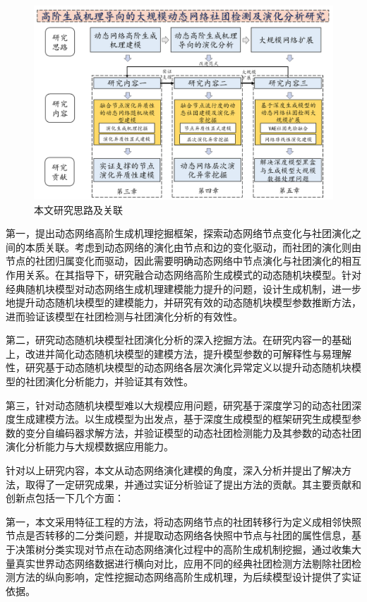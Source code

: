 \begin{figure}[htbp]
    \centering
    \includegraphics[width=.9\linewidth]{figures/chap01/framework.png}
    \caption{本文研究思路及关联}
    \label{chap1:fig:framework}
\end{figure}

第一，提出动态网络高阶生成机理挖掘框架，探索动态网络节点变化与社团演化之间的本质关联。考虑到动态网络的演化由节点和边的变化驱动，而社团的演化则由节点的社团归属变化而驱动，因此需要明确动态网络中节点演化与社团演化的相互作用关系。在其指导下，研究融合动态网络高阶生成模式的动态随机块模型。针对经典随机块模型对动态网络生成机理建模能力提升的问题，设计生成机制，进一步地提升动态随机块模型的建模能力，并研究有效的动态随机块模型参数推断方法，进而验证该模型在社团检测与社团演化分析的有效性。

第二，研究动态随机块模型社团演化分析的深入挖掘方法。在研究内容一的基础上，改进并简化动态随机块模型的建模方法，提升模型参数的可解释性与易理解性，研究基于动态随机块模型的动态网络各层次演化异常定义以提升动态随机块模型的社团演化分析能力，并验证其有效性。

第三，针对动态随机块模型难以大规模应用问题，研究基于深度学习的动态社团深度生成建模方法。以生成模型为出发点，基于深度生成模型的框架研究生成模型参数的变分自编码器求解方法，并验证模型的动态社团检测能力及其参数的动态社团演化分析能力与大规模数据应用能力。

针对以上研究内容，本文从动态网络演化建模的角度，深入分析并提出了解决方法，取得了一定研究成果，并通过实证分析验证了提出方法的贡献。其主要贡献和创新点包括一下几个方面：

第一，本文采用特征工程的方法，将动态网络节点的社团转移行为定义成相邻快照节点是否转移的二分类问题，并提取动态网络各快照中节点与社团的属性信息，基于决策树分类实现对节点在动态网络演化过程中的高阶生成机制挖掘，通过收集大量真实世界动态网络数据进行横向对比，应用不同的经典社团检测方法剔除社团检测方法的纵向影响，定性挖掘动态网络高阶生成机理，为后续模型设计提供了实证依据。

